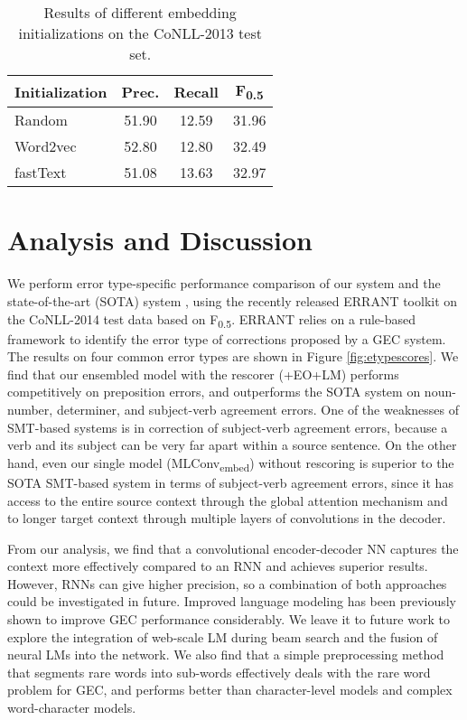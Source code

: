 \documentclass[letterpaper]{article} \usepackage{aaai18}  \usepackage{times}  \usepackage{helvet}  \usepackage{courier}  \usepackage{url}  \usepackage{graphicx}  \frenchspacing  \setlength{\pdfpagewidth}{8.5in}  \setlength{\pdfpageheight}{11in}  \usepackage{amssymb}
\begin{document}
\begin{table}[t]
\centering
\small
\begin{tabular}{|l|c|c|c|}
 \hline
Initialization  &	 Prec. & 	Recall & 	F\textsubscript{0.5} 	\\
\hline 
Random 			&	51.90	&	12.59	& 31.96		\\ 
Word2vec 		&	52.80	&	12.80	& 32.49	\\ 
\hline
fastText 		&	51.08   &   13.63   & 32.97   	\\ 
\hline
\end{tabular}
\caption{Results of different embedding initializations on the CoNLL-2013 test set.}
\label{tbl:embeddings}
\end{table}

\section{Analysis and Discussion}

We perform error type-specific performance comparison of our system and the state-of-the-art (SOTA) system \cite{chollampatt2017connectingdots}, using the recently released ERRANT toolkit \cite{bryant2017automatic} on the CoNLL-2014 test data based on F\textsubscript{0.5}. ERRANT relies on a rule-based framework to identify the error type of corrections proposed by a GEC system. The results on four common error types are shown in Figure \ref{fig:etypescores}. We find that our ensembled model with the rescorer (+EO+LM) performs competitively on preposition errors, and outperforms the SOTA system on noun-number, determiner, and subject-verb agreement errors. One of the weaknesses of SMT-based systems is in correction of subject-verb agreement errors, because a verb and its subject can be very far apart within a source sentence. On the other hand, even our single model (MLConv\textsubscript{embed}) without rescoring is superior to the SOTA SMT-based system in terms of subject-verb agreement errors, since it has access to the entire source context through the global attention mechanism and to longer target context through multiple layers of convolutions in the decoder. 

From our analysis, we find that a convolutional encoder-decoder NN captures the context more effectively compared to an RNN and achieves superior results. However, RNNs can give higher precision, so a combination of both approaches could be investigated in future. Improved language modeling has been previously shown to improve GEC performance considerably. We leave it to future work to explore the integration of web-scale LM during beam search and the fusion of neural LMs into the network. We also find that a simple preprocessing method that segments rare words into sub-words effectively deals with the rare word problem for GEC, and performs better than character-level models and complex word-character models. 
\end{document}
